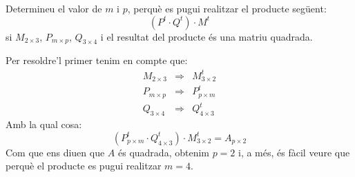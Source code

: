 \Exercise
  Determineu el valor de $m$ i $p$, perquè es pugui realitzar el producte següent:
  \[
    (P^t\cdot Q^t)\cdot M^t
    \]
    si $M_{2 \times 3}$, $P_{m \times p}$, $Q_{3 \times 4}$ i el resultat del producte és una matriu quadrada.

\Answer
  Per resoldre'l primer tenim en compte que:
  \begin{eqnarray*}
    M_{2 \times 3} &\Rightarrow& M^t_{3 \times 2}\\
    P_{m \times p} &\Rightarrow& P^t_{p \times m}\\
    Q_{3 \times 4} &\Rightarrow& Q^t_{4 \times 3}
  \end{eqnarray*}
  Amb la qual cosa:
  \[
    (P^t_{p \times m}\cdot Q^t_{4 \times 3})\cdot M^t_{3 \times 2}=A_{p \times 2}
    \]
    Com que ens diuen que $A$ és quadrada, obtenim $p=2$ i, a més, és fàcil veure que perquè el producte es pugui realitzar $m=4$.
    \blacksquare
